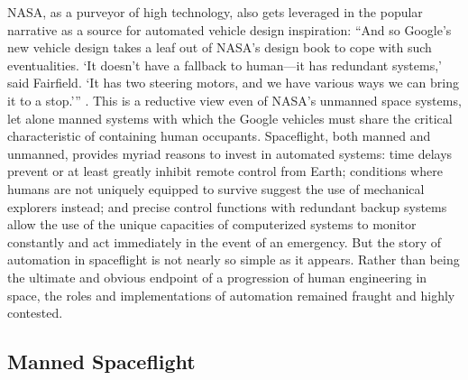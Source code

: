
NASA, as a purveyor of high technology, also
gets leveraged in the popular narrative as a source for
  automated vehicle design inspiration: ``And so Google's new vehicle
  design 
takes a leaf out of NASA's design book to cope with such
eventualities. `It doesn't have a fallback to human---it has redundant
systems,' said Fairfield. `It has two steering motors, and we have
various ways we can bring it to a stop.''' \cite{simonite}. This is a
reductive view even of NASA's unmanned space
systems, let alone manned systems with which the Google vehicles must share
the critical characteristic of containing human occupants.
Spaceflight, both manned and unmanned, provides myriad reasons to
invest in automated systems: time delays prevent or at least greatly
inhibit remote control from Earth; conditions where humans are not
uniquely equipped to survive suggest the use of mechanical explorers
instead; and precise control functions with redundant backup systems
allow the use of the unique capacities of computerized systems to
monitor constantly and act immediately in the event of an emergency.
 But the story of automation in spaceflight is
not nearly so simple as it appears. Rather than being the ultimate and
obvious endpoint of a progression of human engineering in space, the
roles and implementations of automation remained fraught and highly
contested. 


\subsection{Manned Spaceflight}




